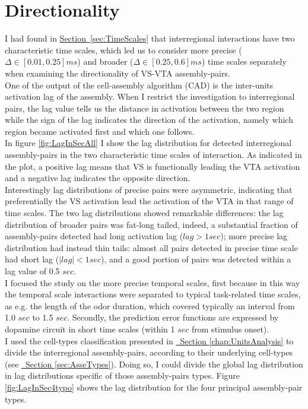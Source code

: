 \section{Directionality} 
\label{sec:Directionality}
 I had found in \hyperref[sec:TimeScales]{Section~\ref*{sec:TimeScales}} that interregional interactions have two characteristic time scales, which led us to consider more precise ($\Delta \in [0.01,0.25] ms$) and broader ($\Delta \in [0.25,0.6] ms$) time scales separately when examining the directionality of VS-VTA assembly-pairs.\\One of the output of the cell-assembly algorithm (CAD) is the inter-units activation lag of the assembly. When I restrict the investigation to interregional pairs, the lag value tells us the distance in activation between the two region while the sign of the lag indicates the direction of the activation, namely which region became activated first and which one follows.\\In figure \ref{fig:LagInSecAll} I show the lag distribution for detected interregional assembly-pairs in the two characteristic time scales of interaction. As indicated in the plot, a positive lag means that VS is functionally leading the VTA activation and a negative lag indicates the opposite direction.\\Interestingly lag distributions of precise pairs were asymmetric, indicating that preferentially the VS activation lead the activation of the VTA in that range of time scales. The two lag distributions showed remarkable differences: the lag distribution of broader pairs was fat-long tailed, indeed, a substantial fraction of assembly-pairs detected had long activation lag ($lag > 1 sec$); more precise lag distribution had instead thin tails: almost all pairs detected in precise time scale had short lag ($|lag| < 1 sec$), and a good portion of pairs was detected within a lag value of 0.5 $sec$.\\
 I focused the study on the more precise temporal scales, first because in this way the temporal scale interactions were separated to typical task-related time scales, as e.g. the length of the odor duration, which covered typically an interval from 1.0 $sec$ to 1.5 $sec$. Secondly, the prediction error functions are expressed by dopamine circuit in short time scales (within 1 $sec$ from stimulus onset).\\ I used the cell-types classification presented in \hyperref[chap:UnitsAnalysis]{~Section \ref*{chap:UnitsAnalysis}} to divide the interregional assembly-pairs, according to their underlying cell-types (see \hyperref[sec:AsseTypes]{~Section \ref*{sec:AsseTypes}}). Doing so, I could divide the global lag distribution in lag distributions specific of those assembly-pairs types. Figure \ref{fig:LagInSec4typo} shows the lag distribution for the four principal assembly-pair types.\\
